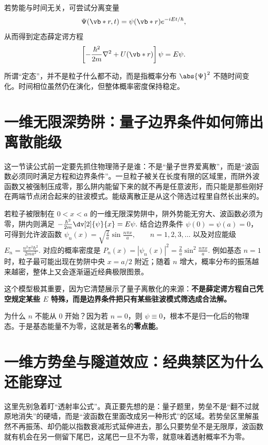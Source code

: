 \documentclass[lang=cn,11pt]{elegantbook}
\begin{document}
若势能与时间无关，可尝试分离变量
\[
\Psi(\vb*{r},t)=\psi(\vb*{r})e^{-iEt/\hbar},
\]
从而得到定态薛定谔方程
\[
\left[-\frac{\hbar^2}{2m}\nabla^2+U(\vb*{r})\right]\psi=E\psi.
\]

\begin{remark}
所谓“定态”，并不是粒子什么都不动，而是指概率分布 \(\abs{\Psi}^2\) 不随时间变化。时间相位虽然仍在演化，但整体概率密度保持稳定。
\end{remark}

\section{一维无限深势阱：量子边界条件如何筛出离散能级}

这一节读公式前一定要先抓住物理筛子是谁：不是“量子世界爱离散”，而是“波函数必须同时满足方程和边界条件”。一旦粒子被关在长度有限的区域里，而阱外波函数又被强制压成零，那么阱内能留下来的就不再是任意波形，而只能是那些刚好在两端节点闭合起来的驻波模式。能级离散正是从这个筛选过程里自然长出来的。

若粒子被限制在 \(0<x<a\) 的一维无限深势阱中，阱外势能无穷大、波函数必须为零，阱内则满足
 \(-\frac{\hbar^2}{2m}\dv[2]{\psi}{x}=E\psi.\) 
结合边界条件 \(\psi(0)=\psi(a)=0\)，可得到允许波函数
 \(\psi_n(x)=\sqrt{\frac{2}{a}}\sin\frac{n\pi x}{a}, \qquad n=1,2,3,\dots\) 
以及对应能级
 \(E_n=\frac{n^2\pi^2\hbar^2}{2ma^2}.\) 
对应的概率密度是
 \(P_n(x)=|\psi_n(x)|^2=\frac{2}{a}\sin^2\frac{n\pi x}{a}.\) 
例如基态 \(n=1\) 时，粒子最可能出现在势阱中央 \(x=a/2\) 附近；随着 \(n\) 增大，概率分布的振荡越来越密，整体上又会逐渐逼近经典极限图景。

这个模型极其重要，因为它清楚展示了量子离散化的来源：\textbf{不是薛定谔方程自己凭空规定某些 \(E\) 特殊，而是边界条件把只有某些驻波模式筛选成合法解。}

\begin{note}
为什么 \(n\) 不能从 0 开始？因为若 \(n=0\)，则 \(\psi\equiv 0\)，根本不是归一化后的物理态。于是基态能量不为零，这就是著名的\textbf{零点能}。
\end{note}

\section{一维方势垒与隧道效应：经典禁区为什么还能穿过}

这里先别急着盯“透射率公式”。真正要先想的是：量子题里，势垒不是“翻不过就原地消失”的硬墙，而是“波函数在里面改成另一种形式”的区域。若势垒区里解虽然不再振荡、却仍能以指数衰减形式延伸进去，那么只要势垒不是无限厚，波函数就有机会在另一侧留下尾巴，这尾巴一旦不为零，就意味着透射概率不为零。
\end{document}
